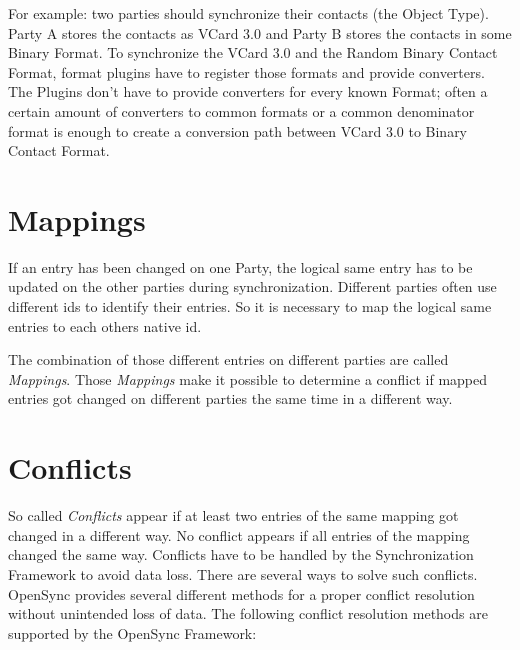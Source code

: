 For example: two parties should synchronize their contacts (the Object Type). Party
A stores the contacts as VCard 3.0 and Party B stores the contacts in some
Binary Format. To synchronize the VCard 3.0 and the Random Binary Contact Format,
format plugins have to register those formats and provide converters. The
Plugins don't have to provide converters for every known Format; often a certain
amount of converters to common formats or a common denominator format is enough
to create a conversion path between VCard 3.0 to Binary Contact Format.

\section{Mappings}
If an entry has been changed on one Party, the logical same entry has to be updated
on the other parties during synchronization. Different parties often use
different ids to identify their entries. So it is necessary to map the logical
same entries to each others native id. 

The combination of those different
entries on different parties are called \emph{Mappings}. Those \emph{Mappings} make it
possible to determine a conflict if mapped entries got changed on different
parties the same time in a different way.

\section{Conflicts}
So called \emph{Conflicts} appear if at least two entries of the same mapping got
changed in a different way. No conflict appears if all entries of the mapping
changed the same way. Conflicts have to be handled by the Synchronization
Framework to avoid data loss. There are several ways to solve such conflicts.
OpenSync provides several different methods for a proper conflict resolution without
unintended loss of data. The following conflict resolution methods are supported by
the OpenSync Framework:

